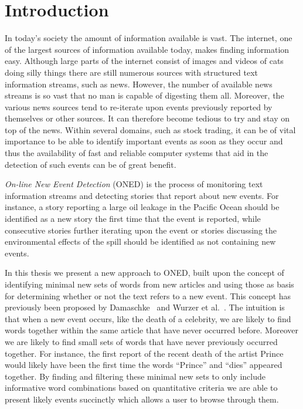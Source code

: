 \chapter{Introduction}
\label{chapter:introduction}
In today's society the amount of information available is vast. The internet, one of the largest sources of information available today, makes finding information easy. Although large parts of the internet consist of images and videos of cats doing silly things there are still numerous sources with structured text information streams, such as news. However, the number of available news streams is so vast that no man is capable of digesting them all. Moreover, the various news sources tend to re-iterate upon events previously reported by themselves or other sources. It can therefore become tedious to try and stay on top of the news. 
Within several domains, such as stock trading, it can be of vital importance to be able to identify important events as soon as they occur and thus the availability of fast and reliable computer systems that aid in the detection of such events can be of great benefit. 


\emph{On-line New Event Detection} (ONED) is the process of monitoring text information streams and detecting stories that report about new events. For instance, a story reporting a large oil leakage in the Pacific Ocean should be identified as a new story the first time that the event is reported, while consecutive stories further iterating upon the event or stories discussing the environmental effects of the spill should be identified as not containing new events. 

In this thesis we present a new approach to ONED, built upon the concept of identifying minimal new sets of words from new articles and using those as basis for determining whether or not the text refers to a new event. This concept has previously been proposed by Damaschke~\cite{damaschke2015pairs} and Wurzer et al.~\cite{wurzer2015kterm}. The intuition is that when a new event occurs, like the death of a celebrity, we are likely to find words together within the same article that have never occurred before. Moreover we are likely to find small sets of words that have never previously occurred together. For instance, the first report of the recent death of the artist Prince would likely have been the first time the words ``Prince'' and ``dies'' appeared together. By finding and filtering these minimal new sets to only include informative word combinations based on quantitative criteria we are able to present likely events succinctly which allows a user to browse through them.

